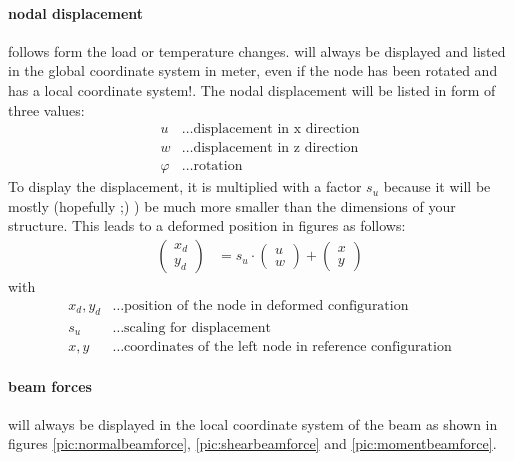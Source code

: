 \documentclass[a4paper,11pt]{report}
\begin{document}
\paragraph{nodal displacement} follows form the load or temperature changes. will always be displayed and listed in the global coordinate system in meter, even if the node has been rotated and has a local coordinate system!. The nodal displacement will be listed in form of three values:
\begin{align*}
u &\dots \text{displacement in x direction}\\
w &\dots \text{displacement in z direction}\\
\varphi &\dots \text{rotation}
\end{align*}
To display the displacement, it is multiplied with a factor $s_u$ because it will be mostly (hopefully ;) ) be much more smaller than the dimensions of your structure. This leads to a deformed position in figures as follows:
\begin{align}
\left(\begin{array}{r} x_d\\ y_d \end{array} \right) &= s_u \cdot \left(\begin{array}{r} u\\ w \end{array} \right) + \left(\begin{array}{r} x \\ y \end{array}\right)
\end{align}
with
\begin{align*}
x_d, y_d &\dots \text{position of the node in deformed configuration}\\
s_u &\dots \text{scaling for displacement}\\
x, y &\dots \text{coordinates of the left node in reference configuration}
\end{align*}

\paragraph{beam forces} will always be displayed in the local coordinate system of the beam as shown in figures \ref{pic:normalbeamforce}, \ref{pic:shearbeamforce} and \ref{pic:momentbeamforce}.
\end{document}
